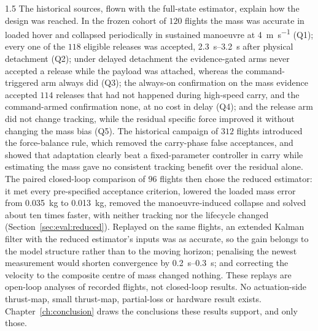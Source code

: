 \begin{spacing}{1.5}
The historical sources, flown with the full-state estimator, explain how the
design was reached. In the frozen cohort of $120$ flights the mass was accurate in
loaded hover and collapsed periodically in sustained manoeuvre at
\SI{4}{\meter\per\second} (Q1); every one of the $118$ eligible releases was
accepted, \SIrange{2.3}{3.2}{\second} after physical detachment (Q2); under
delayed detachment the evidence-gated arms never accepted a release while the
payload was attached, whereas the command-triggered arm always did (Q3); the
always-on confirmation on the mass evidence accepted $114$ releases that had not
happened during high-speed carry, and the command-armed confirmation none, at no
cost in delay (Q4); and the release arm did not change tracking, while the
residual specific force improved it without changing the mass bias (Q5). The
historical campaign of $312$ flights introduced the force-balance rule, which
removed the carry-phase false acceptances, and showed that adaptation clearly
beat a fixed-parameter controller in carry while estimating the mass gave no
consistent tracking benefit over the residual alone. The paired closed-loop
comparison of $96$ flights then chose the reduced estimator: it met every
pre-specified acceptance criterion, lowered the loaded mass error from
\SI{0.035}{\kg} to \SI{0.013}{\kg}, removed the manoeuvre-induced collapse and
solved about ten times faster, with neither tracking nor the lifecycle changed
(Section~\ref{sec:eval:reduced}). Replayed on the same flights, an extended
Kalman filter with the reduced estimator's inputs was as accurate, so the gain
belongs to the model structure rather than to the moving horizon; penalising the
newest measurement would shorten convergence by \SIrange{0.2}{0.3}{\second}; and
correcting the velocity to the composite centre of mass changed nothing. These
replays are open-loop analyses of recorded flights, not closed-loop results. No
actuation-side thrust-map, small thrust-map, partial-loss or hardware result
exists. Chapter~\ref{ch:conclusion} draws the conclusions these results support,
and only those.

\end{spacing}
\newpage
